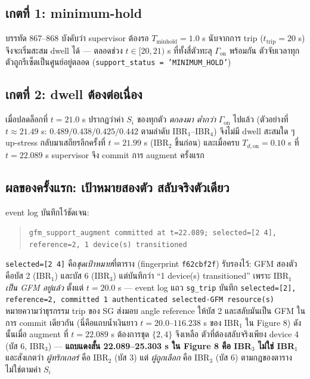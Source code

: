 \documentclass[11pt,a4paper]{article}
\newcommand{\code}[1]{\texttt{\small #1}}
\begin{document}
\subsection{เกตที่ 1: minimum-hold}
บรรทัด 867--868 บังคับว่า supervisor ต้องรอ
$T_{\mathrm{minhold}} = 1.0$ s นับจากการ trip ($t_{\mathrm{trip}} = 20$ s)
จึงจะเริ่มสะสม dwell ได้ — ตลอดช่วง $t \in [20, 21)$ s ที่ทั้งสี่ตัวทะลุ
$\Gamma_{\mathrm{on}}$ พร้อมกัน ตัวจับเวลาทุกตัวถูกรีเซ็ตเป็นศูนย์อยู่ตลอด
(\code{support\_status = 'MINIMUM\_HOLD'})

\subsection{เกตที่ 2: dwell ต้องต่อเนื่อง}
เมื่อปลดล็อกที่ $t = 21.0$ s ปรากฏว่าค่า $S_i$ ของทุกตัว \emph{ตกลงมา
ต่ำกว่า} $\Gamma_{\mathrm{on}}$ ไปแล้ว (ตัวอย่างที่ $t \approx 21.49$ s:
$0.489 / 0.438 / 0.425 / 0.442$ ตามลำดับ IBR$_1$--IBR$_4$) จึงไม่มี dwell
สะสมใด ๆ up-stress กลับมาเสถียรอีกครั้งที่ $t = 21.99$ s (IBR$_2$ ขึ้นก่อน) และเมื่อครบ $T_{d,\mathrm{on}} = 0.10$ s ที่ $t = 22.089$ s
supervisor จึง commit การ augment ครั้งแรก

\subsection{ผลของครั้งแรก: เป้าหมายสองตัว สลับจริงตัวเดียว}
event log บันทึกไว้ชัดเจน:

\begin{quote}\small
\code{gfm\_support\_augment committed at t=22.089; selected=[2 4],
reference=2, 1 device(s) transitioned}
\end{quote}

\code{selected=[2 4]} คือ\emph{ชุดเป้าหมาย}ที่ตาราง (fingerprint
\code{f62cbf2f}) รับรองไว้: GFM สองตัวคือบัส 2 (IBR$_1$) และบัส 6
(IBR$_3$) แต่บันทึกว่า ``1 device(s) transitioned'' เพราะ IBR$_1$
\emph{เป็น GFM อยู่แล้ว} ตั้งแต่ $t = 20.0$ s --- event log แถว
\code{sg\_trip} บันทึก \code{selected=[2], reference=2, committed 1
authenticated selected-GFM resource(s)} หมายความว่าธุรกรรม trip ของ SG
ส่งมอบ angle reference ให้บัส 2 และสลับมันเป็น GFM ในการ commit เดียวกัน
(นี่คือแถบน้ำเงินยาว $t = 20.0$--$116.238$ s ของ IBR$_1$ ใน Figure 8)
ดังนั้นเมื่อ augment ที่ $t = 22.089$ s ต้องการชุด $\{2,4\}$ จึงเหลือ
ตัวที่ต้องสลับจริงเพียง device 4 (บัส 6, IBR$_3$) ---
\textbf{แถบแดงสั้น 22.089--25.303 s ใน Figure 8 คือ IBR$_3$ ไม่ใช่
IBR$_1$} และสังเกตว่า \emph{ผู้ทริกเกอร์} คือ IBR$_2$ (บัส 3)
แต่ \emph{ผู้ถูกเลือก} คือ IBR$_3$ (บัส 6) ตามกฎของตาราง
ไม่ใช่ตามค่า $S_i$
\end{document}
